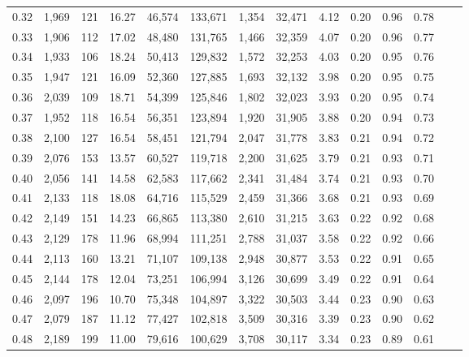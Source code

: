 \begin{tabular}{rrrrrrrrrrrrrr}
0.32 &  1,969 &    121 &   16.27 &   46,574 &  133,671 &   1,354 &  32,471 &  4.12 &  0.20 &  0.96 &      0.78 \\
0.33 &  1,906 &    112 &   17.02 &   48,480 &  131,765 &   1,466 &  32,359 &  4.07 &  0.20 &  0.96 &      0.77 \\
0.34 &  1,933 &    106 &   18.24 &   50,413 &  129,832 &   1,572 &  32,253 &  4.03 &  0.20 &  0.95 &      0.76 \\
0.35 &  1,947 &    121 &   16.09 &   52,360 &  127,885 &   1,693 &  32,132 &  3.98 &  0.20 &  0.95 &      0.75 \\
0.36 &  2,039 &    109 &   18.71 &   54,399 &  125,846 &   1,802 &  32,023 &  3.93 &  0.20 &  0.95 &      0.74 \\
0.37 &  1,952 &    118 &   16.54 &   56,351 &  123,894 &   1,920 &  31,905 &  3.88 &  0.20 &  0.94 &      0.73 \\
0.38 &  2,100 &    127 &   16.54 &   58,451 &  121,794 &   2,047 &  31,778 &  3.83 &  0.21 &  0.94 &      0.72 \\
0.39 &  2,076 &    153 &   13.57 &   60,527 &  119,718 &   2,200 &  31,625 &  3.79 &  0.21 &  0.93 &      0.71 \\
0.40 &  2,056 &    141 &   14.58 &   62,583 &  117,662 &   2,341 &  31,484 &  3.74 &  0.21 &  0.93 &      0.70 \\
0.41 &  2,133 &    118 &   18.08 &   64,716 &  115,529 &   2,459 &  31,366 &  3.68 &  0.21 &  0.93 &      0.69 \\
0.42 &  2,149 &    151 &   14.23 &   66,865 &  113,380 &   2,610 &  31,215 &  3.63 &  0.22 &  0.92 &      0.68 \\
0.43 &  2,129 &    178 &   11.96 &   68,994 &  111,251 &   2,788 &  31,037 &  3.58 &  0.22 &  0.92 &      0.66 \\
0.44 &  2,113 &    160 &   13.21 &   71,107 &  109,138 &   2,948 &  30,877 &  3.53 &  0.22 &  0.91 &      0.65 \\
0.45 &  2,144 &    178 &   12.04 &   73,251 &  106,994 &   3,126 &  30,699 &  3.49 &  0.22 &  0.91 &      0.64 \\
0.46 &  2,097 &    196 &   10.70 &   75,348 &  104,897 &   3,322 &  30,503 &  3.44 &  0.23 &  0.90 &      0.63 \\
0.47 &  2,079 &    187 &   11.12 &   77,427 &  102,818 &   3,509 &  30,316 &  3.39 &  0.23 &  0.90 &      0.62 \\
0.48 &  2,189 &    199 &   11.00 &   79,616 &  100,629 &   3,708 &  30,117 &  3.34 &  0.23 &  0.89 &      0.61 \\

\end{tabular}

